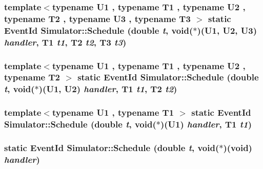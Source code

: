 \hypertarget{classSimulator_2bc6f517e3b3a284b6b52efc47a9da76}{
\subsubsection[{Schedule}]{\setlength{\rightskip}{0pt plus 5cm}template$<$typename U1 , typename T1 , typename U2 , typename T2 , typename U3 , typename T3 $>$ static {\bf EventId} Simulator::Schedule (double {\em t}, \/  void($\ast$)(U1, U2, U3) {\em handler}, \/  T1 {\em t1}, \/  T2 {\em t2}, \/  T3 {\em t3})}}
\label{classSimulator_2bc6f517e3b3a284b6b52efc47a9da76}


\hypertarget{classSimulator_612e0d3f87f3461aa116ca3552adf11a}{
\subsubsection[{Schedule}]{\setlength{\rightskip}{0pt plus 5cm}template$<$typename U1 , typename T1 , typename U2 , typename T2 $>$ static {\bf EventId} Simulator::Schedule (double {\em t}, \/  void($\ast$)(U1, U2) {\em handler}, \/  T1 {\em t1}, \/  T2 {\em t2})}}
\label{classSimulator_612e0d3f87f3461aa116ca3552adf11a}


\hypertarget{classSimulator_e76c104f5cfd844df6054a3c7956a098}{
\subsubsection[{Schedule}]{\setlength{\rightskip}{0pt plus 5cm}template$<$typename U1 , typename T1 $>$ static {\bf EventId} Simulator::Schedule (double {\em t}, \/  void($\ast$)(U1) {\em handler}, \/  T1 {\em t1})}}
\label{classSimulator_e76c104f5cfd844df6054a3c7956a098}


\hypertarget{classSimulator_e5e8a4479b8e2a7b4ecdb3eb8561b960}{
\subsubsection[{Schedule}]{\setlength{\rightskip}{0pt plus 5cm}static {\bf EventId} Simulator::Schedule (double {\em t}, \/  void($\ast$)(void) {\em handler})}}
\label{classSimulator_e5e8a4479b8e2a7b4ecdb3eb8561b960}


